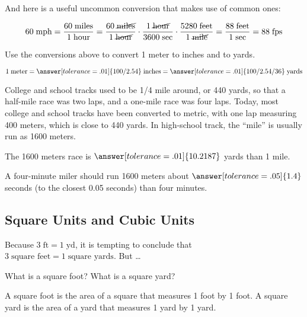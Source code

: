 \documentclass[nooutcomes]{ximera}
\begin{document}
And here is a useful uncommon conversion that makes use of common ones: 

\[
60\;\textrm{mph} = \frac{60\;\textrm{miles}}{1\;\textrm{hour}} 
=  \frac{60\;\cancel{\textrm{miles}}}{1\;\cancel{\textrm{hour}}} \cdot \frac{1\;\cancel{\textrm{hour}}}{3600\;\textrm{sec}} \cdot 
\frac{5280\;\textrm{feet}}{{1\;\cancel{\textrm{mile}}}} = \frac{88\;\textrm{feet}}{1\;\textrm{sec}} = 88\;\textrm{fps}
\]

\begin{question}
Use the conversions above to convert 1 meter to inches and to yards. 

\[
1\;\textrm{meter} = \answer[tolerance=.01]{100/2.54}\;\textrm{inches} = \answer[tolerance=.01]{100/2.54/36}\;\textrm{yards}
\] 

\end{question}

\begin{question}
College and school tracks used to be 1/4 mile around, or 440 yards, so that a half-mile race was two laps, and a one-mile race was four laps.  Today, most college and school tracks have been converted to metric, with one lap measuring 400 meters, which is close to 440 yards.  In high-school track, the ``mile'' is usually run as 1600 meters.  

The 1600 meters race is $\answer[tolerance=.01]{10.2187}$ yards  than 1 mile.  

A four-minute miler should run 1600 meters about $\answer[tolerance=.05]{1.4}$ seconds (to the closest 0.05 seconds)  than four minutes.  
\end{question}


\subsection{Square Units and Cubic Units}
Because $3\;\textrm{ft} = 1 \;\textrm{yd}$, it is tempting to conclude that $3\;\textrm{square feet} = 1 \;\textrm{square yards}$.  But \dots

\begin{question}
What is a square foot?  What is a square yard? 
\begin{freeResponse}
\begin{hint}
A square foot is the area of a square that measures 1 foot by 1 foot.  A square yard is the area of a yard that measures 1 yard by 1 yard. 
\end{hint}
\end{freeResponse}
\end{question}
\end{document}
